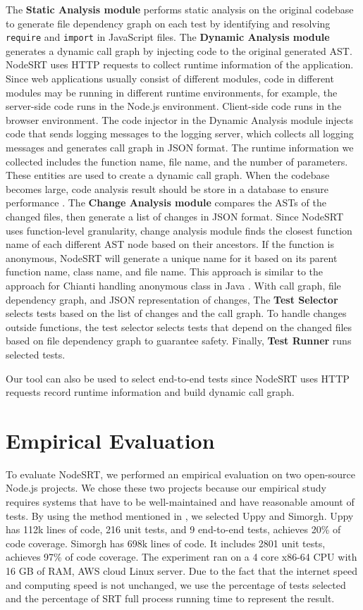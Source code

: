 \documentclass[10pt, conference]{IEEEtran}
\begin{document}
 The \textbf{Static Analysis module} performs static analysis on the original codebase to generate file dependency
graph on each test by identifying and resolving \verb|require| and \verb|import| in JavaScript files. 
The \textbf{Dynamic Analysis module} generates a dynamic call graph by injecting code to the original  
generated AST. 
NodeSRT uses HTTP requests to collect runtime information of the application. Since web applications usually consist of different modules, code in 
different modules may be running in different runtime environments, for example, the server-side code runs in the Node.js 
environment. Client-side code runs in the browser environment. The code injector in the Dynamic Analysis module injects code that sends logging messages to 
the logging server, which collects all logging messages and generates call graph in JSON format. The runtime information we collected includes the function name, file name, and the number of parameters. 
These entities are used to create a dynamic call graph. When the codebase becomes large, code analysis result should be store in a database to ensure performance \cite{b2, b4}. 
The \textbf{Change Analysis module} compares the ASTs of the changed files, then generate a list of changes in JSON format. Since NodeSRT uses function-level 
granularity, change analysis module finds the closest function name of each different AST node based on their ancestors. 
If the function is anonymous, NodeSRT will generate a unique name for it based on its parent function name, class name, and file name. 
This approach is similar to the approach for Chianti handling anonymous class in Java \cite{b12}. With call graph, file dependency graph, 
and JSON representation of changes, The \textbf{Test Selector} selects tests based on the list of changes and the call graph. To handle changes outside 
functions, the test selector selects tests that depend on the changed files based on file dependency graph to guarantee safety. 
Finally, \textbf{Test Runner} runs selected tests.

Our tool can also be used to select end-to-end tests since NodeSRT uses HTTP requests 
record runtime information and build dynamic call graph.

\section{Empirical Evaluation}

To evaluate NodeSRT, we performed an empirical evaluation on two open-source Node.js projects. We chose these two projects because 
our empirical study requires systems that have to be well-maintained and have reasonable amount of tests. By using the method mentioned in \cite{b10}, 
we selected Uppy and Simorgh. Uppy has 112k lines of code, 216 unit tests, and 9 end-to-end tests, 
achieves 20\% of code coverage. Simorgh has 698k lines of code. 
It includes 2801 unit tests, achieves 97\% of code coverage. The 
experiment ran on a 4 core x86-64 CPU with 16 GB of RAM, AWS cloud Linux server. Due to the fact that the internet speed and computing speed is not 
unchanged, we use the percentage of tests selected and the percentage of SRT full process running time to 
represent the result. 
\end{document}
